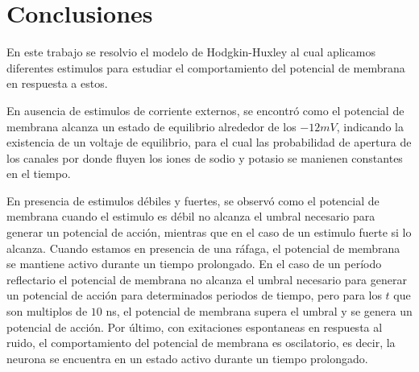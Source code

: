 \documentclass[aps,prl,reprint,groupedaddress]{revtex4-2}
\begin{document}
\section{Conclusiones}

En este trabajo se resolvio el modelo de Hodgkin-Huxley al cual aplicamos 
diferentes estimulos para estudiar el comportamiento del potencial de membrana
en respuesta a estos. 

En ausencia de estimulos de corriente externos, se encontró como el potencial de 
membrana alcanza un estado de equilibrio alrededor de los $-12 mV$, indicando 
la existencia de un voltaje de equilibrio, para el cual las probabilidad de 
apertura de los canales por donde fluyen los iones de sodio y potasio se manienen 
constantes en el tiempo.

En presencia de estimulos débiles y fuertes, se observó como el potencial de
membrana cuando el estimulo es débil no alcanza el umbral necesario para generar
un potencial de acción, mientras que en el caso de un estimulo fuerte si lo 
alcanza. Cuando estamos en presencia de una ráfaga, el potencial de membrana se
mantiene activo durante un tiempo prolongado. En el caso de un período reflectario 
el potencial de membrana no alcanza el umbral necesario para generar un potencial
de acción para determinados periodos de tiempo, pero para los $t$ que son
multiplos de $10$ ns, el potencial de membrana supera el umbral y se genera un
potencial de acción. Por último, con exitaciones espontaneas en respuesta al ruido,
el comportamiento del potencial de membrana es oscilatorio, es decir, la neurona
se encuentra en un estado activo durante un tiempo prolongado.



\end{document}
